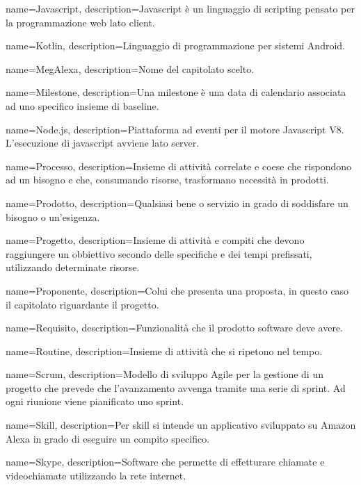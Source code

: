 {
name={Javascript},
description={Javascript è un linguaggio di scripting pensato per la programmazione web lato client.}
}

{
name={Kotlin},
description={Linguaggio di programmazione per sistemi Android.}
}

{
name={MegAlexa},
description={Nome del capitolato scelto.}
}

{
name={Milestone},
description={Una milestone è una data di calendario associata ad uno specifico insieme di baseline.}
}

{
name={Node.js},
description={Piattaforma ad eventi per il motore Javascript V8. L’esecuzione di javascript avviene lato server.}
}

{
name={Processo},
description={Insieme di attività correlate e coese che rispondono ad un bisogno e che, consumando risorse, trasformano necessità in prodotti.}
}

{
name={Prodotto},
description={Qualsiasi bene o servizio in grado di soddisfare un bisogno o un’esigenza.}
}

{
name={Progetto},
description={Insieme di attività e compiti che devono raggiungere un obbiettivo secondo delle specifiche e dei tempi prefissati, utilizzando determinate risorse.}
}

{
name={Proponente},
description={Colui che presenta una proposta, in questo caso il capitolato riguardante il progetto.}
}

{
name={Requisito},
description={Funzionalità che il prodotto software deve avere.}
}

{
name={Routine},
description={Insieme di attività che si ripetono nel tempo.}
}

{
name={Scrum},
description={Modello di sviluppo Agile per la gestione di un progetto che prevede che l’avanzamento avvenga tramite una serie di sprint. Ad ogni riunione viene pianificato uno sprint.}
}

{
name={Skill},
description={Per skill si intende un applicativo sviluppato su Amazon Alexa in grado di eseguire un compito specifico.}
}

{
name={Skype},
description={Software che permette di effetturare chiamate e videochiamate utilizzando la rete internet.}
}

